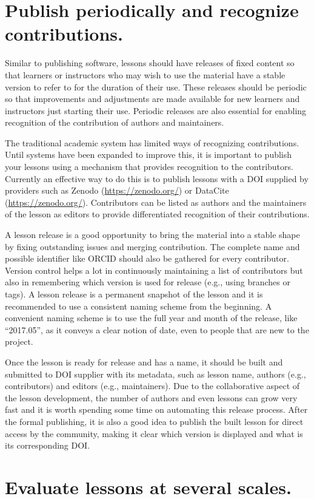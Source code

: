 \documentclass[10pt,letterpaper]{article}
\newcommand{\rulemajor}[1]{\section{#1}}
\begin{document}
\rulemajor{Publish periodically and recognize contributions.}

Similar to publishing software,
lessons should have releases of fixed content
so that learners or instructors who may wish to use the material have a stable version to refer to
for the duration of their use.
These releases should be periodic
so that improvements and adjustments are made available
for new learners and instructors just starting their use.
Periodic releases are also essential
for enabling recognition of the contribution of authors and maintainers.

The traditional academic system has limited ways of recognizing contributions.
Until systems have been expanded to improve this,
it is important to publish your lessons using a mechanism that provides recognition to the contributors.
Currently an effective way to do this is
to publish lessons with a DOI supplied by providers such as Zenodo (\url{https://zenodo.org/})
or DataCite (\url{https://zenodo.org/}).
Contributors can be listed as authors
and the maintainers of the lesson as editors
to provide differentiated recognition of their contributions.

A lesson release is a good opportunity to bring the material into a stable shape
by fixing outstanding issues and merging contribution.
The complete name and possible identifier like ORCID should also be gathered for every contributor.
Version control helps a lot in continuously maintaining a list of contributors
but also in remembering which version is used for release
(e.g., using branches or tags).
A lesson release is a permanent snapshot of the lesson
and it is recommended to use a consistent naming scheme from the beginning.
A convenient naming scheme is to use the full year and month of the release,
like ``2017.05'',
as it conveys a clear notion of date,
even to people that are new to the project.

Once the lesson is ready for release and has a name,
it should be built
and submitted to DOI supplier with its metadata,
such as lesson name, authors (e.g., contributors) and editors (e.g., maintainers).
Due to the collaborative aspect of the lesson development,
the number of authors and even lessons can grow very fast
and it is worth spending some time on automating this release process.
After the formal publishing,
it is also a good idea to publish the built lesson for direct access by the community,
making it clear which version is displayed and what is its corresponding DOI. 
 
\rulemajor{Evaluate lessons at several scales.}
\end{document}
